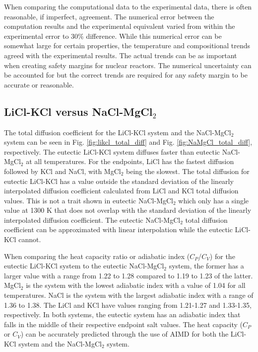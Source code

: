 \documentclass[review]{elsarticle}
\begin{document}
When comparing the computational data to the experimental data, there is often reasonable, if imperfect, agreement. The numerical error between the computation results and the experimental equivalent varied from within the experimental error to 30\% difference. While this numerical error can be somewhat large for certain properties, the temperature and compositional trends agreed with the experimental results. The actual trends can be as important when creating safety margins for nuclear reactors. The numerical uncertainty can be accounted for but the correct trends are required for any safety margin to be accurate or reasonable.

\subsection{LiCl-KCl versus NaCl-MgCl$_2$}

The total diffusion coefficient for the LiCl-KCl system and the NaCl-MgCl$_2$ system can be seen in Fig. \ref{fig:likcl_total_diff} and Fig. \ref{fig:NaMgCl_total_diff}, respectively. The eutectic LiCl-KCl system diffuses faster than eutectic NaCl-MgCl$_2$ at all temperatures. For the endpoints, LiCl has the fastest diffusion followed by KCl and NaCl, with MgCl$_2$ being the slowest. The total diffusion for eutectic LiCl-KCl has a value outside the standard deviation of the linearly interpolated diffusion coefficient calculated from LiCl and KCl total diffusion values. This is not a trait shown in eutectic NaCl-MgCl$_2$ which only has a single value at 1300 K that does not overlap with the standard deviation of the linearly interpolated diffusion coefficient. The eutectic NaCl-MgCl$_2$ total diffusion coefficient can be approximated with linear interpolation while the eutectic LiCl-KCl cannot.


When comparing the heat capacity ratio or adiabatic index ($C_P$/$C_V$) for the eutectic LiCl-KCl system to the eutectic NaCl-MgCl$_2$ system, the former has a larger value with a range from 1.22 to 1.28 compared to 1.19 to 1.23 of the latter. MgCl$_2$ is the system with the lowest adiabatic index with a value of 1.04 for all temperatures. NaCl is the system with the largest adiabatic index with a range of 1.36 to 1.38. The LiCl and KCl have values ranging from 1.21-1.27 and 1.33-1.35, respectively. In both systems, the eutectic system has an adiabatic index that falls in the middle of their respective endpoint salt values. The heat capacity ($C_P$ or $C_V$) can be accurately predicted through the use of AIMD for both the LiCl-KCl system and the NaCl-MgCl$_2$ system.
\end{document}

